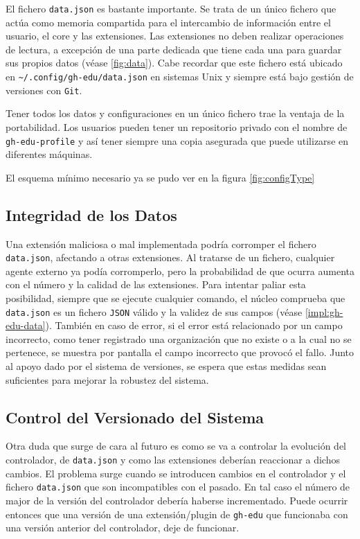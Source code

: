El fichero \verb|data.json| es bastante importante. Se trata de un único fichero que actúa como memoria compartida para el intercambio de información entre el usuario, el core y las extensiones. Las extensiones no deben realizar operaciones de lectura, a excepción de una parte dedicada que tiene cada una para guardar sus propios datos (véase \ref{fig:data}). Cabe recordar que este fichero está ubicado en \verb|~/.config/gh-edu/data.json| en sistemas Unix y siempre está bajo gestión de versiones con \verb|Git|.

Tener todos los datos y configuraciones en un único fichero trae la ventaja de la portabilidad. Los usuarios pueden tener un repositorio privado con el nombre de \verb|gh-edu-profile| y así tener siempre una copia asegurada que puede utilizarse en diferentes máquinas.

El esquema mínimo necesario ya se pudo ver en la figura \ref{fig:configType}

\subsection{Integridad de los Datos}

Una extensión maliciosa o mal implementada podría corromper el fichero \verb|data.json|, afectando a otras extensiones. Al tratarse de un fichero, cualquier agente externo ya podía corromperlo, pero la probabilidad de que ocurra aumenta con el número y la calidad de las extensiones. Para intentar paliar esta posibilidad, siempre que se ejecute cualquier comando, el núcleo comprueba que \verb|data.json| es un fichero \verb|JSON| válido y la validez de sus campos (véase \ref{impl:gh-edu-data}). También en caso de error, si el error está relacionado por un campo incorrecto, como tener registrado una organización que no existe o a la cual no se pertenece, se muestra por pantalla el campo incorrecto que provocó el fallo. Junto al apoyo dado por el sistema de versiones, se espera que estas medidas sean suficientes para mejorar la robustez del sistema.


\subsection{Control del Versionado del Sistema}

Otra duda que surge de cara al futuro es como se va a controlar la evolución del controlador, de  \verb|data.json| y como las extensiones deberían reaccionar a dichos cambios. 
El problema surge cuando se introducen cambios en el controlador y el fichero \verb|data.json| que son incompatibles con el pasado. En tal caso el número de major de la versión  del controlador debería haberse incrementado.
Puede ocurrir entonces que una versión de una extensión/plugin de \verb|gh-edu| que funcionaba con una versión anterior del  controlador, deje de funcionar. 

